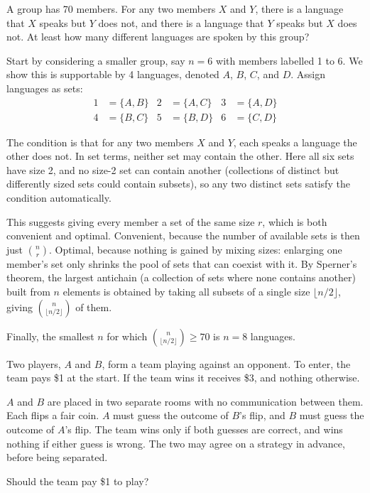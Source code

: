 \begin{problem}
\vspace{-1ex}
A group has 70 members. For any two members $X$ and $Y$, there is a language
that $X$ speaks but $Y$ does not, and there is a language that $Y$ speaks but
$X$ does not. At least how many different languages are spoken by this group?
\end{problem}

\begin{solution}
Start by considering a smaller group, say $n = 6$ with members labelled 1
to 6. We show this is supportable by 4 languages, denoted $A$, $B$, $C$, and
$D$. Assign languages as sets:
\begin{align*}
1 &= \{A, B\} & 2 &= \{A, C\} & 3 &= \{A, D\} \\
4 &= \{B, C\} & 5 &= \{B, D\} & 6 &= \{C, D\}
\end{align*}

\vspace{-0.5em}

The condition is that for any two members $X$ and $Y$, each speaks a language the
other does not. In set terms, neither set may contain the other. Here all six
sets have size 2, and no size-2 set can contain another (collections of distinct but differently sized sets could contain subsets), so any two distinct sets
satisfy the condition automatically.

This suggests giving every member a set of the same size $r$, which is both
convenient and optimal. Convenient, because the number of available sets is then just $\binom{n}{r}$. Optimal, because nothing is gained by mixing sizes: enlarging one member's set
only shrinks the pool of sets that can coexist with it. By Sperner's theorem, the
largest antichain (a collection of sets where none contains another) built from
$n$ elements is obtained by taking all subsets of a single size
$\lfloor n/2 \rfloor$, giving $\binom{n}{\lfloor n/2 \rfloor}$ of them. 

Finally, the smallest $n$ for which $\binom{n}{\lfloor n/2 \rfloor} \ge 70$ is $n=8$ languages. 
\end{solution}


\newpage

\begin{problem}
Two players, $A$ and $B$, form a team playing against an opponent. To enter,
the team pays \$1 at the start. If the team wins it receives \$3, and nothing
otherwise.

$A$ and $B$ are placed in two separate rooms with no communication between them.
Each flips a fair coin. $A$ must guess the outcome of $B$'s flip, and $B$ must
guess the outcome of $A$'s flip. The team wins only if both guesses are correct,
and wins nothing if either guess is wrong. The two may agree on a strategy in
advance, before being separated.

Should the team pay \$1 to play?
\end{problem}

